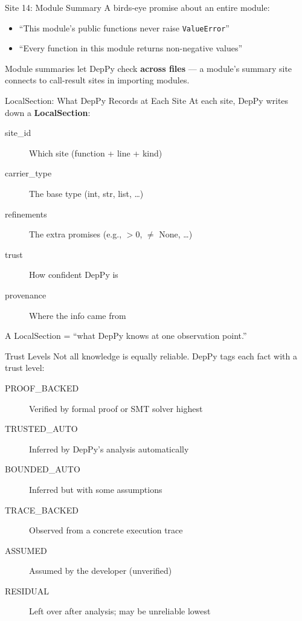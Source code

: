 \documentclass[aspectratio=169,10pt]{beamer}
\newcommand{\hint}[1]{\begin{center}
  \colorbox{hintbg}{\parbox{0.88\textwidth}{\centering\small #1}}\end{center}}
\begin{document}
\begin{frame}{Site 14: Module Summary}
A birds-eye promise about an entire module:
\vspace{0.3em}
\begin{itemize}
  \item ``This module's public functions never raise \texttt{ValueError}''
  \item ``Every function in this module returns non-negative values''
\end{itemize}
\vspace{0.3em}
Module summaries let DepPy check \textbf{across files} --- a module's summary site connects to call-result sites in importing modules.
\end{frame}

\begin{frame}{LocalSection: What DepPy Records at Each Site}
At each site, DepPy writes down a \textbf{LocalSection}:
\vspace{0.3em}
\begin{description}
  \item[site\_id] Which site (function + line + kind)
  \item[carrier\_type] The base type (int, str, list, \ldots)
  \item[refinements] The extra promises (e.g., $> 0$, $\neq$ None, \ldots)
  \item[trust] How confident DepPy is
  \item[provenance] Where the info came from
\end{description}
\vspace{0.3em}
\hint{A LocalSection = ``what DepPy knows at one observation point.''}
\end{frame}

\begin{frame}{Trust Levels}
Not all knowledge is equally reliable. DepPy tags each fact with a trust level:
\vspace{0.3em}
\begin{description}
  \item[PROOF\_BACKED] Verified by formal proof or SMT solver \hfill \textcolor{safe}{highest}
  \item[TRUSTED\_AUTO] Inferred by DepPy's analysis automatically
  \item[BOUNDED\_AUTO] Inferred but with some assumptions
  \item[TRACE\_BACKED] Observed from a concrete execution trace
  \item[ASSUMED] Assumed by the developer (unverified)
  \item[RESIDUAL] Left over after analysis; may be unreliable \hfill \textcolor{danger}{lowest}
\end{description}
\end{frame}
\end{document}
